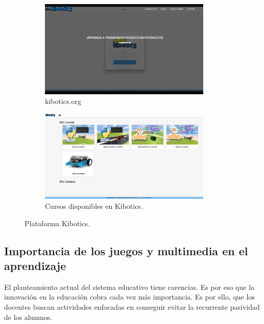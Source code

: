 \begin{figure}[H]
  \begin{subfigure}[b]{0.5\textwidth}
  \centering
    \includegraphics[width=0.9\textwidth, height=0.6\textwidth]{chapters/images/kiboticsorg.png}
    \caption{kibotics.org}
    \label{fig:f1}
  \end{subfigure}
  \hfill
  \begin{subfigure}[b]{0.5\textwidth}
  \centering
    \includegraphics[width=0.9\textwidth, height=0.6\textwidth]{chapters/images/kibotics.png}
    \caption{Cursos disponibles en Kibotics.}
    \label{fig:f2}
  \end{subfigure}
  \caption{Plataforma Kibotics.}
\end{figure}
 
\subsection{Importancia de los juegos y multimedia en el aprendizaje} 
El planteamiento actual del sistema educativo tiene carencias. Es por eso que la innovación en la educación cobra cada vez más importancia. Es por ello, que los docentes buscan actividades enfocadas en conseguir evitar la recurrente pasividad de los alumnos\cite{multimedia}.

